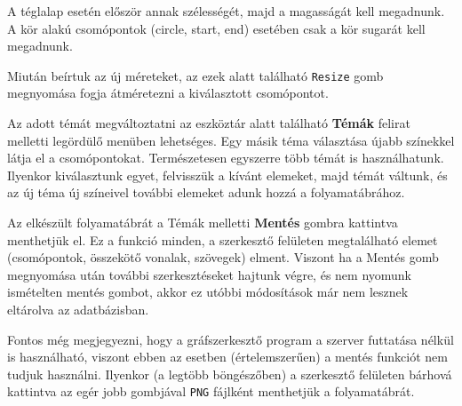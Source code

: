 A téglalap esetén először annak szélességét, majd a magasságát kell megadnunk. A kör alakú csomópontok (circle, start, end) esetében csak a kör sugarát kell megadnunk.

Miután beírtuk az új méreteket, az ezek alatt található \texttt{Resize} gomb megnyomása fogja átméretezni a kiválasztott csomópontot.


Az adott témát megváltoztatni az eszköztár alatt található \textbf{Témák} felirat melletti legördülő menüben lehetséges. Egy másik téma választása újabb színekkel látja el a csomópontokat. Természetesen egyszerre több témát is használhatunk. Ilyenkor kiválasztunk egyet, felvisszük a kívánt elemeket, majd témát váltunk, és az új téma új színeivel további elemeket adunk hozzá a folyamatábrához.


Az elkészült folyamatábrát a Témák melletti \textbf{Mentés} gombra kattintva menthetjük el. Ez a funkció minden, a szerkesztő felületen megtalálható elemet (csomópontok, összekötő vonalak, szövegek) elment. Viszont ha a Mentés gomb megnyomása után további szerkesztéseket hajtunk végre, és nem nyomunk ismételten mentés gombot, akkor ez utóbbi módosítások már nem lesznek eltárolva az adatbázisban.

Fontos még megjegyezni, hogy a gráfszerkesztő program a szerver futtatása nélkül is használható, viszont ebben az esetben (értelemszerűen) a mentés funkciót nem tudjuk használni. Ilyenkor (a legtöbb böngészőben) a szerkesztő felületen bárhová kattintva az egér jobb gombjával \texttt{PNG} fájlként menthetjük a folyamatábrát.